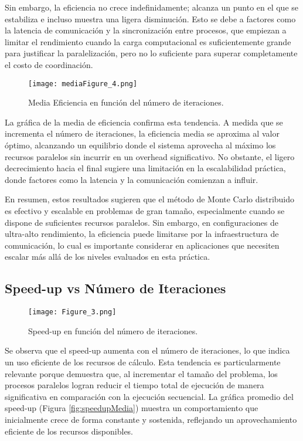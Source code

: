 \documentclass[conference, a4paper]{IEEEtran}
\begin{document}
Sin embargo, la eficiencia no crece indefinidamente; alcanza un punto en el que se estabiliza e incluso muestra una ligera disminución. Esto se debe a factores como la latencia de comunicación y la sincronización entre procesos, que empiezan a limitar el rendimiento cuando la carga computacional es suficientemente grande para justificar la paralelización, pero no lo suficiente para superar completamente el costo de coordinación.

\begin{figure}[H]
    \centering
    \texttt{[image: mediaFigure\_4.png]}
    \caption{Media Eficiencia en función del número de iteraciones.}
    \label{fig:eficiencia}
\end{figure}

La gráfica de la media de eficiencia confirma esta tendencia. A medida que se incrementa el número de iteraciones, la eficiencia media se aproxima al valor óptimo, alcanzando un equilibrio donde el sistema aprovecha al máximo los recursos paralelos sin incurrir en un overhead significativo. No obstante, el ligero decrecimiento hacia el final sugiere una limitación en la escalabilidad práctica, donde factores como la latencia y la comunicación comienzan a influir.

En resumen, estos resultados sugieren que el método de Monte Carlo distribuido es efectivo y escalable en problemas de gran tamaño, especialmente cuando se dispone de suficientes recursos paralelos. Sin embargo, en configuraciones de ultra-alto rendimiento, la eficiencia puede limitarse por la infraestructura de comunicación, lo cual es importante considerar en aplicaciones que necesiten escalar más allá de los niveles evaluados en esta práctica.

\subsection{Speed-up vs Número de Iteraciones}
\begin{figure}[H]
    \centering
    \texttt{[image: Figure\_3.png]}
    \caption{Speed-up en función del número de iteraciones.}
    \label{fig:speedup}
\end{figure}

Se observa que el speed-up aumenta con el número de iteraciones, lo que indica un uso eficiente de los recursos de cálculo. Esta tendencia es particularmente relevante porque demuestra que, al incrementar el tamaño del problema, los procesos paralelos logran reducir el tiempo total de ejecución de manera significativa en comparación con la ejecución secuencial. La gráfica promedio del speed-up (Figura \ref{fig:speedupMedia}) muestra un comportamiento que inicialmente crece de forma constante y sostenida, reflejando un aprovechamiento eficiente de los recursos disponibles.
\end{document}
